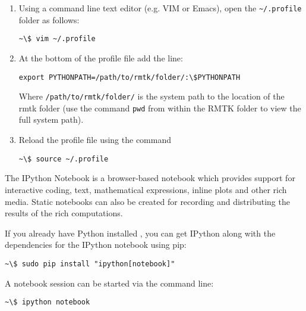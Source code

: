 \begin{enumerate}
\item Using a command line text editor (e.g. VIM or Emacs), open the \verb=~/.profile= folder as follows:

\begin{Verbatim}[frame=single, commandchars=\\\{\}, fontsize=\scriptsize]
~\$ vim ~/.profile
\end{Verbatim}

\item At the bottom of the profile file add the line:

\begin{Verbatim}[frame=single, commandchars=\\\{\}, fontsize=\scriptsize]
export PYTHONPATH=/path/to/rmtk/folder/:\$PYTHONPATH
\end{Verbatim}

Where \verb=/path/to/rmtk/folder/= is the system path to the location of the rmtk folder (use the command \verb=pwd= from within the RMTK folder to view the full system path).

\item Reload the profile file using the command

\begin{Verbatim}[frame=single, commandchars=\\\{\}, fontsize=\scriptsize]
~\$ source ~/.profile
\end{Verbatim}

\end{enumerate}

The IPython Notebook is a browser-based notebook which provides support for interactive coding, text, mathematical expressions, inline plots and other rich media. Static notebooks can also be created for recording and distributing the results of the rich computations.

If you already have Python installed , you can get IPython along with the dependencies for the IPython notebook using pip:

\begin{Verbatim}[frame=single, commandchars=\\\{\}, fontsize=\scriptsize, samepage=true]
~\$ sudo pip install "ipython[notebook]"
\end{Verbatim}

A notebook session can be started via the command line:

\begin{Verbatim}[frame=single, commandchars=\\\{\}, fontsize=\scriptsize, samepage=true]
~\$ ipython notebook
\end{Verbatim}

